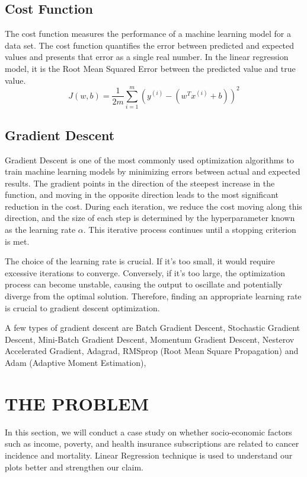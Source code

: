 \documentclass[conference]{IEEEtran}
\begin{document}
\subsection{Cost Function}
The cost function measures the performance of a machine learning model for a data set. The cost function quantifies the error between predicted and expected values and presents that error as a single real number. In the linear regression model, it is the Root Mean Squared Error between the predicted value and true value.
\begin{equation}
J(w,b) = \frac{1}{2m} \sum_{i=1}^{m} (y^{(i)} - (w^T x^{(i)} + b))^2
\end{equation}

\subsection{Gradient Descent}
Gradient Descent is one of the most commonly used optimization algorithms to train machine learning models by minimizing errors between actual and expected results. The gradient points in the direction of the steepest increase in the function, and moving in the opposite direction leads to the most significant reduction in the cost. During each iteration, we reduce the cost moving along this direction, and the size of each step is determined by the hyperparameter known as the learning rate \(\alpha\). This iterative process continues until a stopping criterion is met.

The choice of the learning rate is crucial. If it's too small, it would require excessive iterations to converge. Conversely, if it's too large, the optimization process can become unstable, causing the output to oscillate and potentially diverge from the optimal solution. Therefore, finding an appropriate learning rate is crucial to gradient descent optimization.

A few types of gradient descent are Batch Gradient Descent, Stochastic Gradient Descent, Mini-Batch Gradient Descent, Momentum Gradient Descent, Nesterov Accelerated Gradient, Adagrad, RMSprop (Root Mean Square Propagation) and Adam (Adaptive Moment Estimation), 

\vspace{1mm} %

\section{THE PROBLEM}
In this section, we will conduct a case study on whether socio-economic factors such as income, poverty, and health insurance subscriptions are related to cancer incidence and mortality. Linear Regression technique is used to understand our plots better and strengthen our claim.
\end{document}
